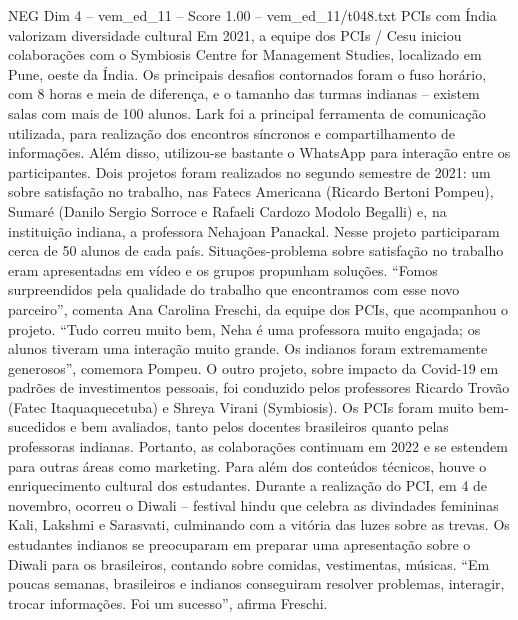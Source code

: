 \begin{textsample}{NEG Dim 4 – vem\_ed\_11 – Score 1.00 – vem\_ed\_11/t048.txt}  \label{ex:f4_neg_003}
PCIs com Índia valorizam diversidade cultural Em 2021, a equipe dos PCIs / Cesu iniciou colaborações com o Symbiosis Centre for Management Studies, localizado em Pune, oeste da Índia.
Os principais desafios contornados foram o fuso horário, com 8 horas e meia de diferença, e o tamanho das turmas indianas – existem salas com mais de 100 alunos.
Lark foi a principal ferramenta de comunicação utilizada, para realização dos encontros síncronos e compartilhamento de informações.
Além disso, utilizou-se bastante o WhatsApp para interação entre os participantes.
Dois projetos foram realizados no segundo semestre de 2021: um sobre satisfação no trabalho, nas Fatecs Americana (Ricardo Bertoni Pompeu), Sumaré (Danilo Sergio Sorroce e Rafaeli Cardozo Modolo Begalli) e, na instituição indiana, a professora Nehajoan Panackal.
Nesse projeto participaram cerca de 50 alunos de cada país.
Situações-problema sobre satisfação no trabalho eram apresentadas em vídeo e os grupos propunham soluções. “Fomos surpreendidos pela qualidade do trabalho que encontramos com esse novo parceiro”, comenta Ana Carolina Freschi, da equipe dos PCIs, que acompanhou o projeto. “Tudo correu muito bem, Neha é uma professora muito engajada; os alunos tiveram uma interação muito grande.
Os indianos foram extremamente generosos”, comemora Pompeu.
O outro projeto, sobre impacto da Covid-19 em padrões de investimentos pessoais, foi conduzido pelos professores Ricardo Trovão (Fatec Itaquaquecetuba) e Shreya Virani (Symbiosis).
Os PCIs foram muito bem-sucedidos e bem avaliados, tanto pelos docentes brasileiros quanto pelas professoras indianas.
Portanto, as colaborações continuam em 2022 e se estendem para outras áreas como marketing.
Para além dos conteúdos técnicos, houve o enriquecimento cultural dos estudantes.
Durante a realização do PCI, em 4 de novembro, ocorreu o Diwali – festival hindu que celebra as divindades femininas Kali, Lakshmi e Sarasvati, culminando com a vitória das luzes sobre as trevas.
Os estudantes indianos se preocuparam em preparar uma apresentação sobre o Diwali para os brasileiros, contando sobre comidas, vestimentas, músicas. “Em poucas semanas, brasileiros e indianos conseguiram resolver problemas, interagir, trocar informações.
Foi um sucesso”, afirma Freschi.

\end{textsample}
